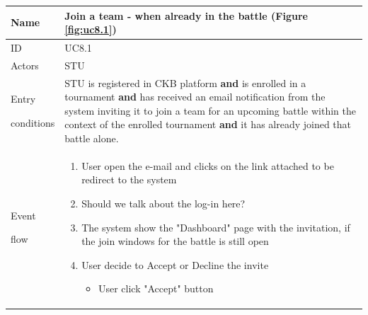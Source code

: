 \begin{center}
    \def\arraystretch{1.5}
    \begin{tabular}{| m{2cm} | m{10cm}|}
        \hline
        Name                  & Join a team - when already in the battle (Figure \ref{fig:uc8.1})                                                                                                                                \\ \hline
        ID                    & UC8.1                                                                                                                                                                                            \\ \hline
        Actors                & STU                                                                                                                                                                                              \\ \hline
        Entry \par conditions & STU is registered in CKB platform
        \textbf{and} is enrolled in a tournament
        \textbf{and} has received an email notification from the system inviting it to join a team for an upcoming battle within the context of the enrolled tournament
        \textbf{and} it has already joined that battle alone.                                                                                                                                                                    \\ \hline
        Event \par flow       & \begin{enumerate}
                                    \item User open the e-mail and clicks on the link attached to be redirect to the system
                                    \item {\color{red} Should we talk about the log-in here?}
                                    \item The system show the "Dashboard" page with the invitation, if the join windows for the battle is still open
                                    \item User decide to Accept or Decline the invite
                                          \begin{itemize}
                      \item User click "Accept" button
                  \end{itemize}

\end{enumerate}
\end{tabular}
\end{center}
